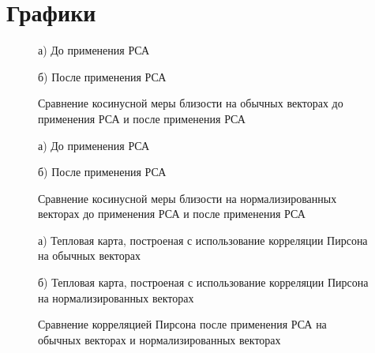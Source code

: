 \section{Графики}

\begin{figure}[H]
    \begin{minipage}[H]{0.5\linewidth}
        а) До применения РСА
    \end{minipage}
    \begin{minipage}[H]{0.5\linewidth}
        б) После применения РСА
    \end{minipage}
    \caption{Сравнение косинусной меры близости на обычных векторах до применения РСА и после применения РСА}
    \label{fig:minipageHeatmapCos}
\end{figure}

\begin{figure}[H]
    \begin{minipage}[H]{0.5\linewidth}
        а) До применения РСА
    \end{minipage}
    \begin{minipage}[H]{0.5\linewidth}
        б) После применения РСА
    \end{minipage}
    \caption{Сравнение косинусной меры близости на нормализированных векторах до применения РСА и после применения РСА}
    \label{fig:minipageHeatmapCosNorm}
\end{figure}

\begin{figure}[H]
    \begin{minipage}[H]{0.5\linewidth}
        а) Тепловая карта, построеная с использование корреляции Пирсона на обычных векторах
    \end{minipage}
    \begin{minipage}[H]{0.5\linewidth}
        б) Тепловая карта, построеная с использование корреляции Пирсона на нормализированных векторах
    \end{minipage}
    \caption{Сравнение корреляцией Пирсона после применения РСА на обычных векторах и нормализированных векторах}
    \label{fig:minipageHeatmapPearson}
\end{figure}

